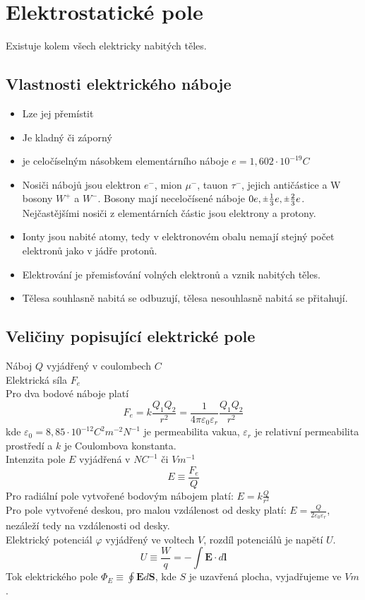 \documentclass[titlepage]{report}
\newcommand{\rpm}{\sbox0{$1$}\sbox2{$\scriptstyle\pm$}
  \raise\dimexpr(\ht0-\ht2)/2\relax\box2 }
\begin{document}
\chapter{Elektrostatické pole}
Existuje kolem všech elektricky nabitých těles.
\section{Vlastnosti elektrického náboje}
\begin{itemize}
\item Lze jej přemístit
\item Je kladný či záporný
\item je celočíselným násobkem elementárního náboje $e = 1,602 \cdot 10^{-19}C$
\item Nosiči nábojů jsou elektron $e^-$, mion $\mu^-$, tauon $\tau^-$, jejich antičástice a W bosony $W^+$ a $W^-$. Bosony mají neceločísené náboje $0e, \rpm\frac{1}{3}e, \rpm\frac{2}{3}e$. Nejčastějšími nosiči z elementárních částic jsou elektrony a protony.
\item Ionty jsou nabité atomy, tedy v elektronovém obalu nemají stejný počet elektronů jako v jádře protonů.
\item Elektrování je přemisťování volných elektronů a vznik nabitých těles.
\item Tělesa souhlasně nabitá se odbuzují, tělesa nesouhlasně nabitá se přitahují.
\end{itemize}
\section{Veličiny popisující elektrické pole}
Náboj $Q$ vyjádřený v coulombech $C$\\
Elektrická síla $F_e$\\
Pro dva bodové náboje platí\\
\begin{equation}
F_e = k\frac{Q_1Q_2}{r^2} = \frac{1}{4\pi \varepsilon_0\varepsilon_r}\frac{Q_1Q_2}{r^2}
\end{equation}
kde $\varepsilon_0 = 8,85 \cdot 10^{-12} C^2m^{-2}N^{-1}$ je permeabilita vakua, $\varepsilon_r$ je relativní permeabilita prostředí a $k$ je Coulombova konstanta.\\
Intenzita pole $E$ vyjádřená v $NC^{-1}$ či $Vm^{-1}$\\
\begin{equation}
E \equiv \frac{F_e}{Q}
\end{equation}
Pro radiální pole vytvořené bodovým nábojem platí: $E = k\frac{Q}{r^2}$\\
Pro pole vytvořené deskou, pro malou vzdálenost od desky platí: $E = \frac{Q}{2\varepsilon_0\varepsilon_r}$, nezáleží tedy na vzdálenosti od desky.\\
Elektrický potenciál $\varphi$ vyjádřený ve voltech $V$, rozdíl potenciálů je napětí $U$.\\
\begin{equation}
U \equiv \frac{W}{q} = -\int \boldsymbol E \cdot d\boldsymbol l
\end{equation}
Tok elektrického pole $\Phi_E \equiv \oint \boldsymbol E d\boldsymbol S$, kde $S$ je uzavřená plocha, vyjadřujeme ve $Vm$.
\end{document}
